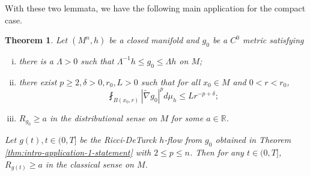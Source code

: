 \documentclass[12pt]{amsart}
\theoremstyle{plain}
\newtheorem{theorem}[subsection]{Theorem}
\theoremstyle{plain}
\theoremstyle{definition}
\theoremstyle{remark}
\numberwithin{equation}{subsection}
\newcommand{\hdel}{\tilde{\nabla}}
\begin{document}
With these two lemmata, we have the following main application for the compact case. 

\begin{theorem}\label{thm:preservation-distributional-scalar-curvature-lower-bound}
    Let $(M^n,h)$ be a  closed manifold and $g_0$ be a $C^0$ metric satisfying
    \begin{enumerate}[(i)]
        \item there is a $\Lambda > 0$ such that $\Lambda^{-1}h \leq g_0 \leq \Lambda h$ on $M$;
        \item there exist $p \geq 2, \delta > 0, r_0 ,L> 0$ such that for all $x_0 \in M$ and $0 < r < r_0$,
        \begin{equation}
            \fint_{B(x_0, r)} |\hdel g_0|^p d\mu_h \leq L r^{-p + \delta};
        \end{equation}
   \item $R_{g_0}\geq a$ in the distributional sense on $M$ for some $a\in \mathbb{R}$.
    \end{enumerate}
    Let $g(t), t \in (0, T]$ be the Ricci-DeTurck $h$-flow from $g_0$ obtained in Theorem \ref{thm:intro-application-1-statement} with $2 \leq p \leq n$. Then for any $t \in (0, T]$, $R_{g(t)} \geq a$ in the classical sense on $M$.
\end{theorem}
\end{document}
